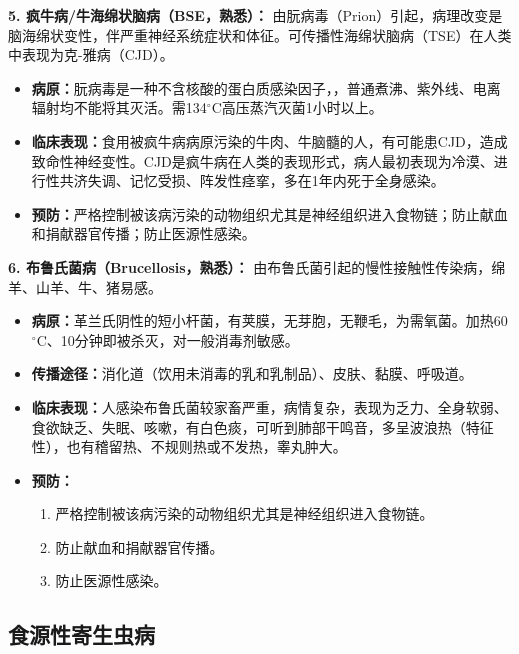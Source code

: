 \begin{defbox}
\textbf{5. 疯牛病/牛海绵状脑病（BSE，熟悉）：}
由朊病毒（Prion）引起，病理改变是脑海绵状变性，伴严重神经系统症状和体征。可传播性海绵状脑病（TSE）在人类中表现为克-雅病（CJD）。
\begin{itemize}[leftmargin=*]
    \item \textbf{病原：}朊病毒是一种不含核酸的蛋白质感染因子，，普通煮沸、紫外线、电离辐射均不能将其灭活。需134$^\circ$C高压蒸汽灭菌1小时以上。
    \item \textbf{临床表现：}食用被疯牛病病原污染的牛肉、牛脑髓的人，有可能患CJD，造成致命性神经变性。CJD是疯牛病在人类的表现形式，病人最初表现为冷漠、进行性共济失调、记忆受损、阵发性痉挛，多在1年内死于全身感染。
    \item \textbf{预防：}严格控制被该病污染的动物组织尤其是神经组织进入食物链；防止献血和捐献器官传播；防止医源性感染。
\end{itemize}

\textbf{6. 布鲁氏菌病（Brucellosis，熟悉）：}
由布鲁氏菌引起的慢性接触性传染病，绵羊、山羊、牛、猪易感。
\begin{itemize}[leftmargin=*]
    \item \textbf{病原：}革兰氏阴性的短小杆菌，有荚膜，无芽胞，无鞭毛，为需氧菌。加热60$^\circ$C、10分钟即被杀灭，对一般消毒剂敏感。
    \item \textbf{传播途径：}消化道（饮用未消毒的乳和乳制品）、皮肤、黏膜、呼吸道。
    \item \textbf{临床表现：}人感染布鲁氏菌较家畜严重，病情复杂，表现为乏力、全身软弱、食欲缺乏、失眠、咳嗽，有白色痰，可听到肺部干鸣音，多呈波浪热（特征性），也有稽留热、不规则热或不发热，睾丸肿大。
    \item \textbf{预防：}
    \begin{enumerate}
        \item 严格控制被该病污染的动物组织尤其是神经组织进入食物链。
        \item 防止献血和捐献器官传播。
        \item 防止医源性感染。
    \end{enumerate}
\end{itemize}
\end{defbox}

\subsection{食源性寄生虫病}

